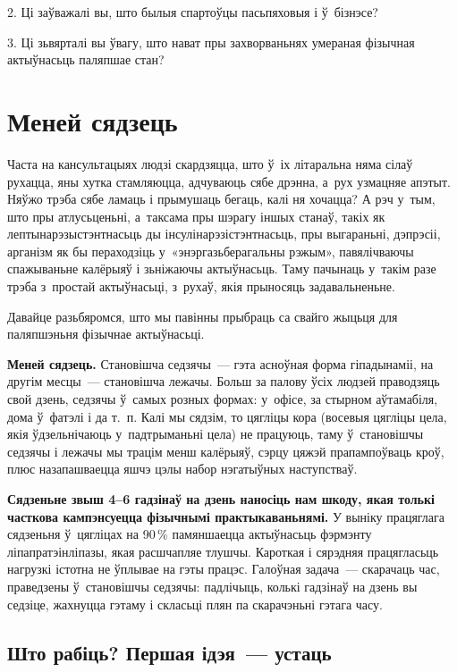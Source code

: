 2. Ці заўважалі вы, што былыя спартоўцы пасьпяховыя і ў~бізнэсе?

3. Ці зьвярталі вы ўвагу, што нават пры захворваньнях умераная фізычная актыўнасьць паляпшае стан?


\section{Меней сядзець}

Часта на кансультацыях людзі скардзяцца, што ў~іх літаральна няма сілаў рухацца, яны хутка стамляюцца, адчуваюць сябе дрэнна, а~рух узмацняе апэтыт. Няўжо трэба сябе ламаць і прымушаць бегаць, калі ня хочацца? А рэч у~тым, што пры атлусьценьні, а~таксама пры шэрагу іншых станаў, такіх як лептынарэзыстэнтнасьць ды інсулінарэзістэнтнасьць, пры выгараньні, дэпрэсіі, арганізм як бы пераходзіць у~«энэргазьберагальны рэжым», павялічваючы спажываньне калёрыяў і зьніжаючы актыўнасьць. Таму пачынаць у~такім разе трэба з~простай актыўнасьці, з~рухаў, якія прыносяць задавальненьне.

Давайце разьбяромся, што мы павінны прыбраць са свайго жыцьця для паляпшэньня фізычнае актыўнасьці. 


\textbf{Меней сядзець.} Становішча седзячы~--- гэта асноўная форма гіпадынаміі, на другім месцы~--- становішча лежачы. Больш за палову ўсіх людзей праводзяць свой дзень, седзячы ў~самых розных формах: у~офісе, за стырном аўтамабіля, дома ў~фатэлі і да т.~п. Калі мы сядзім, то цягліцы кора (восевыя цягліцы цела, якія ўдзельнічаюць у~падтрыманьні цела) не працуюць, таму ў~становішчы седзячы і лежачы мы трацім менш калёрыяў, сэрцу цяжэй прапампоўваць кроў, плюс назапашваецца яшчэ цэлы набор нэгатыўных наступстваў.

\textbf{Сядзеньне звыш 4--6 гадзінаў на дзень наносіць нам шкоду, якая толькі часткова кампэнсуецца фізычнымі практыкаваньнямі.} У выніку працяглага сядзеньня ў~цягліцах на 90\,\% памяншаецца актыўнасьць фэрмэнту ліпапратэінліпазы, якая расшчапляе тлушчы. Кароткая і сярэдняя працягласьць нагрузкі істотна не ўплывае на гэты працэс. Галоўная задача~--- скарачаць час, праведзены ў~становішчы седзячы: падлічыць, колькі гадзінаў на дзень вы седзіце, жахнуцца гэтаму і скласьці плян па скарачэньні гэтага часу.

\subsection*{Што рабіць? Першая ідэя~--- устаць}

